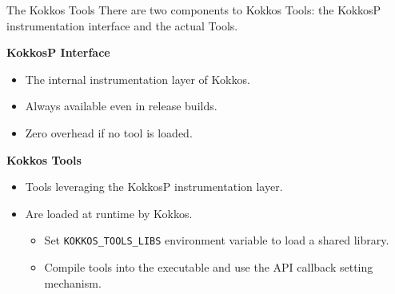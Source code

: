 
\begin{frame}[fragile]{The Kokkos Tools}
  There are two components to Kokkos Tools: the KokkosP instrumentation interface and the actual Tools. 

  \vspace{10pt}
  \textbf{KokkosP Interface}

  \begin{itemize}
    \item The internal instrumentation layer of Kokkos.
    \item Always available even in release builds.
    \item Zero overhead if no tool is loaded.
  \end{itemize}

  \vspace{5pt}
  \textbf{Kokkos Tools}
  \begin{itemize}
    \item Tools leveraging the KokkosP instrumentation layer.
    \item Are loaded at runtime by Kokkos.
    \begin{itemize}
      \item Set \texttt{KOKKOS\_TOOLS\_LIBS} environment variable to load a shared library.
      \item Compile tools into the executable and use the API callback setting mechanism. 
    \end{itemize}
  \end{itemize}
\end{frame}


